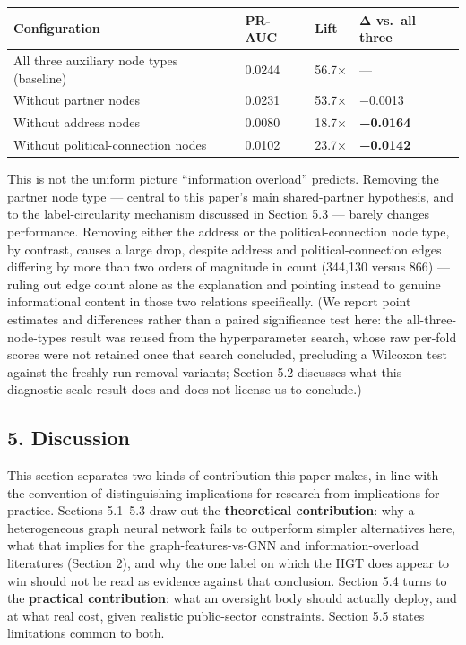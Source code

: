 \documentclass[11pt,]{article}
\begin{document}
\begin{longtable}[]{@{}llll@{}}
\toprule
Configuration & PR-AUC & Lift & Δ vs.~all three\tabularnewline
\midrule
\endhead
All three auxiliary node types (baseline) & 0.0244 & 56.7× &
---\tabularnewline
Without partner nodes & 0.0231 & 53.7× & −0.0013\tabularnewline
Without address nodes & 0.0080 & 18.7× & \textbf{−0.0164}\tabularnewline
Without political-connection nodes & 0.0102 & 23.7× &
\textbf{−0.0142}\tabularnewline
\bottomrule
\end{longtable}

This is not the uniform picture ``information overload'' predicts.
Removing the partner node type --- central to this paper's main
shared-partner hypothesis, and to the label-circularity mechanism
discussed in Section 5.3 --- barely changes performance. Removing either
the address or the political-connection node type, by contrast, causes a
large drop, despite address and political-connection edges differing by
more than two orders of magnitude in count (344,130 versus 866) ---
ruling out edge count alone as the explanation and pointing instead to
genuine informational content in those two relations specifically. (We
report point estimates and differences rather than a paired significance
test here: the all-three-node-types result was reused from the
hyperparameter search, whose raw per-fold scores were not retained once
that search concluded, precluding a Wilcoxon test against the freshly
run removal variants; Section 5.2 discusses what this diagnostic-scale
result does and does not license us to conclude.)

\hypertarget{discussion}{%
\subsection{5. Discussion}\label{discussion}}

This section separates two kinds of contribution this paper makes, in
line with the convention of distinguishing implications for research
from implications for practice. Sections 5.1--5.3 draw out the
\textbf{theoretical contribution}: why a heterogeneous graph neural
network fails to outperform simpler alternatives here, what that implies
for the graph-features-vs-GNN and information-overload literatures
(Section 2), and why the one label on which the HGT does appear to win
should not be read as evidence against that conclusion. Section 5.4
turns to the \textbf{practical contribution}: what an oversight body
should actually deploy, and at what real cost, given realistic
public-sector constraints. Section 5.5 states limitations common to
both.
\end{document}
